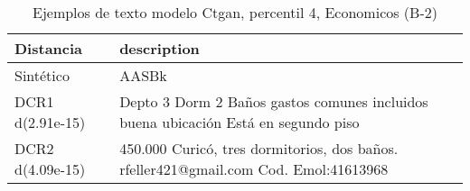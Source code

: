 \begin{table}[H]
\centering
\fontsize{10}{14}\selectfont
\caption{Ejemplos de texto modelo Ctgan, percentil 4, Economicos (B-2)}
\label{table-example-economicos-b-2-ctgan-4p-text}
\begin{tabular}{|l|m{35em}|}
\hline
\rowcolor[gray]{0.8}
Distancia & description \\
\hline Sintético & AASBk \\
\hline DCR1 d(2.91e-15) & Depto 3 Dorm 2 Ba\~nos gastos comunes incluidos buena ubicaci\'on 
Est\'a en segundo piso  \\
\hline DCR2 d(4.09e-15) & 450.000 Curic\'o, tres dormitorios, dos ba\~nos. rfeller421@gmail.com Cod. Emol:41613968 \\
\hline
\end{tabular}
\end{table}

